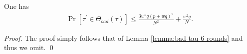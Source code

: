 \begin{definition}
\end{definition}



%
%
%	


\begin{lemma}
	\label{lemma:bad-tau-6-rounds}
	
	One has
	\begin{align}
	\operatorname{Pr}[\tau^{\prime} \in \Theta_{bad}(\tau)] \leq \frac{3w^{2} q \left(p+w q\right)^{2}}{N^{2}} + \frac{w^{2} q}{N}.
	\label{eq:bound-bad-tau-6-rounds}
	\end{align}
\end{lemma}
\begin{proof}
The proof simply follows that of Lemma \ref{lemma:bad-tau-6-rounds} and thus we omit.            \qed
\end{proof}



